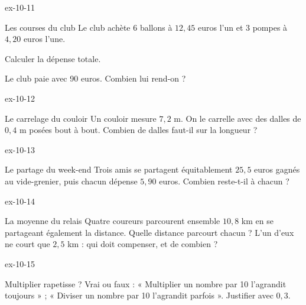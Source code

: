 \begin{blocLivre}{ex-10-11}\begin{exercice}[3]{Les courses du club}
Le club achète 6 ballons à $12{,}45$ euros l’un et 3 pompes à $4{,}20$ euros l’une.\begin{questions}
\item Calculer la dépense totale.
\item Le club paie avec 90 euros. Combien lui rend-on ?
\end{questions}
\end{exercice}\end{blocLivre}
\begin{blocLivre}{ex-10-12}\begin{exercice}[3]{Le carrelage du couloir}
Un couloir mesure $7{,}2$ m. On le carrelle avec des dalles de $0{,}4$ m posées bout à bout. Combien de dalles faut-il sur la longueur ?
\end{exercice}\end{blocLivre}
\begin{blocLivre}{ex-10-13}\begin{exercice}[3]{Le partage du week-end}
Trois amis se partagent équitablement $25{,}5$ euros gagnés au vide-grenier, puis chacun dépense $5{,}90$ euros. Combien reste-t-il à chacun ?
\end{exercice}\end{blocLivre}
\begin{blocLivre}{ex-10-14}\begin{exercice}[3]{La moyenne du relais}
Quatre coureurs parcourent ensemble $10{,}8$ km en se partageant également la distance. Quelle distance parcourt chacun ? L’un d’eux ne court que $2{,}5$ km : qui doit compenser, et de combien ?
\end{exercice}\end{blocLivre}
\begin{blocLivre}{ex-10-15}\begin{exercice}[3]{Multiplier rapetisse ?}
Vrai ou faux : « Multiplier un nombre par 10 l’agrandit toujours » ; « Diviser un nombre par 10 l’agrandit parfois ». Justifier avec $0{,}3$.
\end{exercice}\end{blocLivre}

\clearpage
